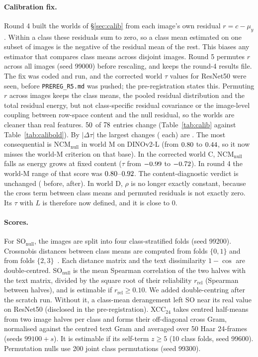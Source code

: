 \documentclass[10pt]{article}
\begin{document}
\paragraph{Calibration fix.} Round 4 built the worlds of \S\ref{sec:calib} from each image's own residual $r=c-\mu_y$. Within a class these residuals sum to zero, so a class mean estimated on one subset of images is the negative of the residual mean of the rest. This biases any estimator that compares class means across disjoint images. Round 5 permutes $r$ across all images (seed 99000) before rescaling, and keeps the round-4 results file. The fix was coded and run, and the corrected world $\tau$ values for ResNet50 were seen, before \texttt{PREREG\_R5.md} was pushed; the pre-registration states this. Permuting $r$ across images keeps the class means, the pooled residual distribution and the total residual energy, but not class-specific residual covariance or the image-level coupling between row-space content and the null residual, so the worlds are cleaner than real features. $50$ of $78$ entries change (Table~\ref{tab:calib} against Table~\ref{tab:calibold}). By $|\Delta\tau|$ the largest changes (\FCalTopDelta{} each) are \FCalTopChanges. The most consequential is NCM$_{\mathrm{null}}$ in world M on DINOv2-L (from $0.80$ to $0.44$, so it now misses the world-M criterion on that base). In the corrected world C, NCM$_{\mathrm{null}}$ falls as energy grows at fixed content ($\tau$ from $-0.99$ to $-0.72$). In round 4 the world-M range of that score was $0.80$--$0.92$. The content-diagnostic verdict is unchanged (\FCalDiagOld{} before, \FCalDiagNew{} after). In world D, $\rho$ is no longer exactly constant, because the cross term between class means and permuted residuals is not exactly zero. Its $\tau$ with $L$ is therefore now defined, and it is close to 0.

\paragraph{Scores.} For SO$_{\mathrm{null}}$, the images are split into four class-stratified folds (seed 99200). Crossnobis distances between class means are computed from folds $\{0,1\}$ and from folds $\{2,3\}$~\citep{walther2016reliability}. Each distance matrix and the text dissimilarity $1-\cos$ are double-centred. SO$_{\mathrm{null}}$ is the mean Spearman correlation of the two halves with the text matrix, divided by the square root of their reliability $r_{\mathrm{rel}}$ (Spearman between halves), and is estimable if $r_{\mathrm{rel}}\ge0.10$. We added double-centring after the scratch run. Without it, a class-mean derangement left SO near its real value on ResNet50 (disclosed in the pre-registration). XCC$_{24}$ takes centred half-means from two image halves per class and forms their off-diagonal cross Gram, normalised against the centred text Gram and averaged over 50 Haar 24-frames (seeds $99100{+}s$). It is estimable if its self-term $z\ge5$ (10 class folds, seed 99600). Permutation nulls use 200 joint class permutations (seed 99300).
\end{document}
